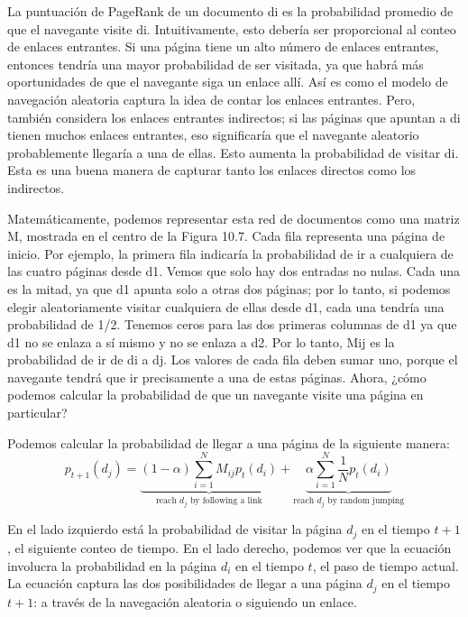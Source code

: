 La puntuación de PageRank de un documento di es la probabilidad promedio de que el navegante visite di. Intuitivamente, esto debería ser proporcional al conteo de enlaces entrantes. Si una página tiene un alto número de enlaces entrantes, entonces tendría una mayor probabilidad de ser visitada, ya que habrá más oportunidades de que el navegante siga un enlace allí. Así es como el modelo de navegación aleatoria captura la idea de contar los enlaces entrantes. Pero, también considera los enlaces entrantes indirectos; si las páginas que apuntan a di tienen muchos enlaces entrantes, eso significaría que el navegante aleatorio probablemente llegaría a una de ellas. Esto aumenta la probabilidad de visitar di. Esta es una buena manera de capturar tanto los enlaces directos como los indirectos.

Matemáticamente, podemos representar esta red de documentos como una matriz M, mostrada en el centro de la Figura 10.7. Cada fila representa una página de inicio. Por ejemplo, la primera fila indicaría la probabilidad de ir a cualquiera de las cuatro páginas desde d1. Vemos que solo hay dos entradas no nulas. Cada una es la mitad, ya que d1 apunta solo a otras dos páginas; por lo tanto, si podemos elegir aleatoriamente visitar cualquiera de ellas desde d1, cada una tendría una probabilidad de 1/2. Tenemos ceros para las dos primeras columnas de d1 ya que d1 no se enlaza a sí mismo y no se enlaza a d2. Por lo tanto, Mij es la probabilidad de ir de di a dj. Los valores de cada fila deben sumar uno, porque el navegante tendrá que ir precisamente a una de estas páginas. Ahora, ¿cómo podemos calcular la probabilidad de que un navegante visite una página en particular?

Podemos calcular la probabilidad de llegar a una página de la siguiente manera:
\begin{equation}
p_{t+1} (d_j) = \underbrace{(1 - \alpha) \sum_{i = 1}^N M_{ij}p_t (d_i)}_{\text{reach } d_j \text{ by following a link}} + \underbrace{\alpha \sum_{i = 1}^N \frac{1}{N}p_t(d_i)}_{\text{reach } d_j \text{ by random jumping}}
\end{equation}

En el lado izquierdo está la probabilidad de visitar la página \(d_j\) en el tiempo \(t+1\), el siguiente conteo de tiempo. En el lado derecho, podemos ver que la ecuación involucra la probabilidad en la página \(d_i\) en el tiempo \(t\), el paso de tiempo actual. La ecuación captura las dos posibilidades de llegar a una página \(d_j\) en el tiempo \(t+1\): a través de la navegación aleatoria o siguiendo un enlace. 

